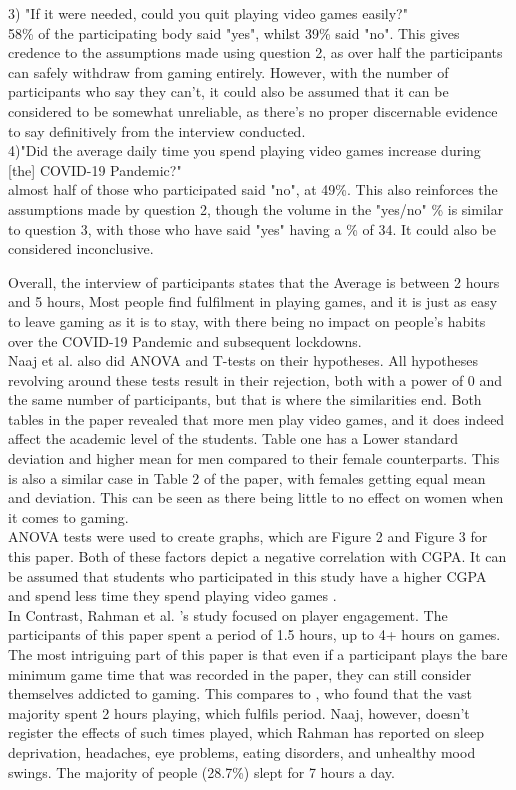 \documentclass[conference]{IEEEtran}
\begin{document}
3) "If it were needed, could you quit playing video games easily?"\\
58\% of the participating body said "yes", whilst 39\% said "no". This gives credence to the assumptions made using question 2, as over half the participants can safely withdraw from gaming entirely. However, with the number of participants who say they can't, it could also be assumed that it can be considered to be somewhat unreliable, as there's no proper discernable evidence to say definitively from the interview conducted.\\ 
 
4)"Did the average daily time you spend playing video games increase during [the] COVID-19 Pandemic?"\\
almost half of those who participated said "no", at 49\%. This also reinforces the assumptions made by question 2, though the volume in the "yes/no" \% is similar to question 3, with those who have said "yes" having a \% of 34. It could also be considered inconclusive.

Overall, the interview of participants states that the Average is between 2 hours and 5 hours, Most people find fulfilment in playing games, and it is just as easy to leave gaming as it is to stay, with there being no impact on people's habits over the COVID-19 Pandemic and subsequent lockdowns.\\

Naaj et al. also did ANOVA and T-tests on their hypotheses. All hypotheses revolving around these tests result in their rejection, both with a power of 0 and the same number of participants, but that is where the similarities end. Both tables in the paper revealed that more men play video games, and it does indeed affect the academic level of the students. Table one has a Lower standard deviation and higher mean for men compared to their female counterparts. This is also a similar case in Table 2 of the paper, with females getting equal mean and deviation. This can be seen as there being little to no effect on women when it comes to gaming.\\

ANOVA tests were used to create graphs, which are Figure 2 and Figure 3 for this paper. Both of these factors depict a negative correlation with CGPA. It can be assumed that students who participated in this study have a higher CGPA and spend less time they spend playing video games \cite{Naaj2021}.\\

In Contrast, Rahman et al. 's \cite{Rahman2021} study focused on player engagement. The participants of this paper spent a period of 1.5 hours, up to 4+ hours on games. The most intriguing part of this paper is that even if a participant plays the bare minimum game time that was recorded in the paper, they can still consider themselves addicted to gaming. This compares to \cite{Naaj2021}, who found that the vast majority spent 2 hours playing, which fulfils \cite{Rahman2021} period. Naaj, however, doesn't register the effects of such times played, which Rahman has reported on sleep deprivation, headaches, eye problems, eating disorders, and unhealthy mood swings. The majority of people (28.7\%) slept for 7 hours a day.\\
\end{document}
